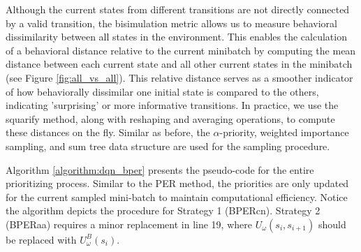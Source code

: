 Although the current states from different transitions are not directly connected by a valid transition, the bisimulation metric allows us to measure behavioral dissimilarity between all states in the environment. This enables the calculation of a behavioral distance relative to the current minibatch by computing the mean distance between each current state and all other current states in the minibatch (see Figure \ref{fig:all_vs_all}). This relative distance serves as a smoother indicator of how behaviorally dissimilar one initial state is compared to the others, indicating 'surprising' or more informative transitions. In practice, we use the squarify method, along with reshaping and averaging operations, to compute these distances on the fly. Similar as before, the $\alpha$-priority, weighted importance sampling, and sum tree data structure are used for the sampling procedure.


Algorithm \ref{algorithm:dqn_bper} presents the pseudo-code for the entire prioritizing process. Similar to the PER method, the priorities are only updated for the current sampled mini-batch to maintain computational efficiency. Notice the algorithm depicts the procedure for Strategy 1 (BPERcn). Strategy 2 (BPERaa) requires a minor replacement in line 19, where \(U_\omega(s_i, s_{i+1})\) should be replaced with \(U^B_\omega(s_i)\).


